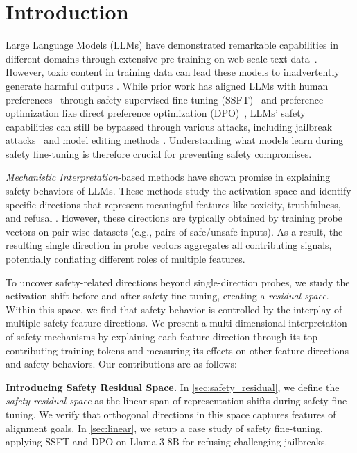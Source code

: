 \section{Introduction}
Large Language Models (LLMs) have demonstrated remarkable capabilities in different domains through extensive pre-training on web-scale text data~\cite{brown2020language, zhao2023survey,qin2024multilingual}. However, toxic content in training data can lead these models to inadvertently generate harmful outputs \cite{su2024mission,gehman2020realtoxicityprompts}. While prior work has aligned LLMs with human preferences~\cite{bai2022training} through safety supervised fine-tuning (SSFT)~\cite{ouyang2022training} and preference optimization like direct preference optimization (DPO)~\cite{rafailov2024direct}, LLMs' safety capabilities can still be bypassed through various attacks, including jailbreak attacks~\cite{zou2023universal,liu2024flipattack,ding2023wolf,yong2023low} and model editing methods \cite{Ball2024UnderstandingJS,arditi2024refusal,carlini2024aligned}. Understanding what models learn during safety fine-tuning is therefore crucial for preventing safety compromises.

\textit{Mechanistic Interpretation}-based methods \cite{bricken2023monosemanticity} have shown promise in explaining safety behaviors of LLMs. These methods study the activation space and identify specific directions that represent meaningful features like toxicity, truthfulness, and refusal \cite{arditi2024refusal, lee2024mechanistic, li2024inference}. However, these directions are typically obtained by training probe vectors on pair-wise datasets (e.g., pairs of safe/unsafe inputs). As a result, the resulting single direction in probe vectors aggregates all contributing signals, potentially conflating different roles of multiple features.

To uncover safety-related directions beyond single-direction probes, we study the activation shift before and after safety fine-tuning, creating a \textit{residual space}. Within this space, we find that safety behavior is controlled by the interplay of multiple safety feature directions. We present a multi-dimensional interpretation of safety mechanisms by explaining each feature direction through its top-contributing training tokens and measuring its effects on other feature directions and safety behaviors. Our contributions are as follows:

\textbf{Introducing Safety Residual Space.} In \autoref{sec:safety_residual}, we define the \emph{safety residual space} as the linear span of representation shifts during safety fine-tuning. We verify that orthogonal directions in this space captures features of alignment goals. In \autoref{sec:linear}, we setup a case study of safety fine-tuning, applying SSFT and DPO on Llama 3 8B for refusing challenging jailbreaks.

